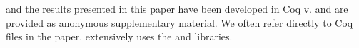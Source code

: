 \gcoql and the results presented in this paper have been developed in Coq v. and are provided as anonymous supplementary material. We often refer directly to Coq files in the paper. \gcoql extensively uses the 
\ssreflect {} and \equations {} libraries. 





